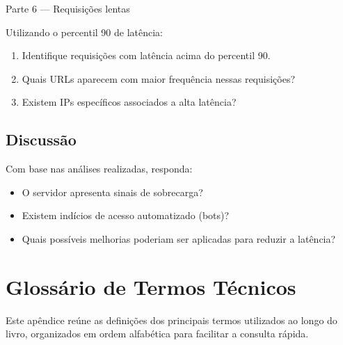 \documentclass[12pt,a4paper]{report}
\begin{document}
\begin{block}{Parte 6 — Requisições lentas}

Utilizando o percentil 90 de latência:

\begin{enumerate}
\item Identifique requisições com latência acima do percentil 90.
\item Quais URLs aparecem com maior frequência nessas requisições?
\item Existem IPs específicos associados a alta latência?
\end{enumerate}

\vspace{1cm}

\end{block}

\section*{Discussão}

Com base nas análises realizadas, responda:

\begin{itemize}
\item O servidor apresenta sinais de sobrecarga?
\item Existem indícios de acesso automatizado (bots)?
\item Quais possíveis melhorias poderiam ser aplicadas para reduzir a latência?
\end{itemize}

\vspace{4cm}

\chapter{Glossário de Termos Técnicos}

Este apêndice reúne as definições dos principais termos utilizados ao longo do livro, organizados em ordem alfabética para facilitar a consulta rápida.
\end{document}
